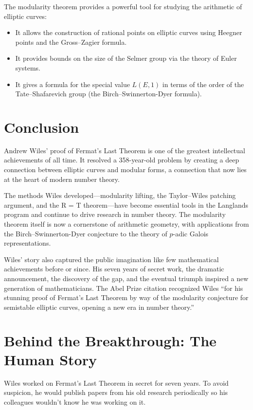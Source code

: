 The modularity theorem provides a powerful tool for studying the arithmetic of elliptic curves:
\begin{itemize}
\item It allows the construction of rational points on elliptic curves using Heegner points and the Gross--Zagier formula.
\item It provides bounds on the size of the Selmer group via the theory of Euler systems.
\item It gives a formula for the special value $L(E, 1)$ in terms of the order of the Tate--Shafarevich group (the Birch--Swinnerton-Dyer formula).
\end{itemize}

\section{Conclusion}

Andrew Wiles' proof of Fermat's Last Theorem is one of the greatest intellectual achievements of all time. It resolved a 358-year-old problem by creating a deep connection between elliptic curves and modular forms, a connection that now lies at the heart of modern number theory.

The methods Wiles developed---modularity lifting, the Taylor--Wiles patching argument, and the R = T theorem---have become essential tools in the Langlands program and continue to drive research in number theory. The modularity theorem itself is now a cornerstone of arithmetic geometry, with applications from the Birch--Swinnerton-Dyer conjecture to the theory of $p$-adic Galois representations.

Wiles' story also captured the public imagination like few mathematical achievements before or since. His seven years of secret work, the dramatic announcement, the discovery of the gap, and the eventual triumph inspired a new generation of mathematicians. The Abel Prize citation recognized Wiles ``for his stunning proof of Fermat's Last Theorem by way of the modularity conjecture for semistable elliptic curves, opening a new era in number theory.''

\section{Behind the Breakthrough: The Human Story}
Wiles worked on Fermat's Last Theorem in secret for seven years. To avoid suspicion, he would publish papers from his old research periodically so his colleagues wouldn't know he was working on it.

